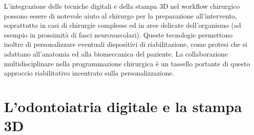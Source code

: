 L'integrazione delle tecniche digitali e della stampa 3D nel workflow chirurgico possono essere di notevole aiuto al chirurgo per la preparazione all'inter\-vento, soprattutto in casi di chirurgie complesse ed in aree delicate dell'organismo (ad esempio in prossimità di fasci neurovascolari). Queste tecnologie permettono inoltre di personalizzare eventuali dispositivi di riabilitazione, come protesi che si adattano all'anatomia ed alla biomeccanica del paziente. La collaborazione multidisciplinare nella programmazione chirurgica è un tassello portante di questo approccio riabilitativo incentrato sulla personalizzazione.


\section{L'odontoiatria digitale e la stampa 3D}
	
